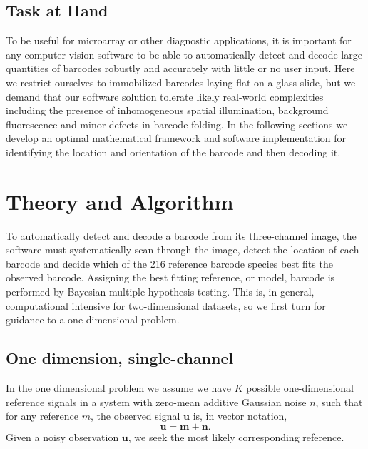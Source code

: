 \subsection{Task at Hand}
To be useful for microarray or other diagnostic applications, it is important for any computer vision software to be able to automatically detect and decode large quantities of barcodes robustly and accurately with little or no user input. 
Here we restrict ourselves to immobilized barcodes laying flat on a glass slide, but we demand that our software solution tolerate  likely real-world complexities including the presence of inhomogeneous spatial illumination, background fluorescence and minor defects in barcode folding.  
In the following sections we develop an optimal mathematical framework and software implementation for identifying the location and orientation of the barcode and then decoding it.


\section{Theory and Algorithm}
To automatically detect and decode a barcode from its three-channel image, the software must systematically scan through the image, detect the location of each barcode and decide which of the 216 reference barcode species best fits the observed barcode. Assigning the best fitting reference, or model, barcode is performed by Bayesian multiple hypothesis testing. This is, in general, computational intensive for two-dimensional datasets, so we first turn for guidance to a one-dimensional problem.


\subsection{One dimension, single-channel}
In the one dimensional problem we assume we have $K$ possible one-dimensional reference signals in a system with zero-mean additive Gaussian noise $n$, such that for any reference $m$, the observed signal $\mathbf{u}$ is, in vector notation,
\begin{equation}
\mathbf{u}=\mathbf{m} + \mathbf{n}.
\end{equation}
Given a noisy observation $\mathbf{u}$, we seek the most likely corresponding reference. 



